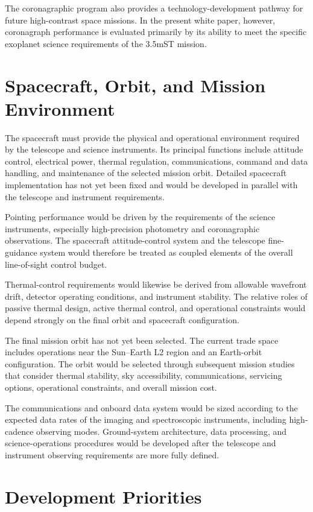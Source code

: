The coronagraphic program also provides a technology-development pathway
for future high-contrast space missions. In the present white paper,
however, coronagraph performance is evaluated primarily by its ability to
meet the specific exoplanet science requirements of the 3.5mST mission.


\section{Spacecraft, Orbit, and Mission Environment}

The spacecraft must provide the physical and operational environment
required by the telescope and science instruments. Its principal functions
include attitude control, electrical power, thermal regulation,
communications, command and data handling, and maintenance of the selected
mission orbit. Detailed spacecraft implementation has not yet been fixed
and would be developed in parallel with the telescope and instrument
requirements.

Pointing performance would be driven by the requirements of the science
instruments, especially high-precision photometry and coronagraphic
observations. The spacecraft attitude-control system and the telescope
fine-guidance system would therefore be treated as coupled elements of the
overall line-of-sight control budget.

Thermal-control requirements would likewise be derived from allowable
wavefront drift, detector operating conditions, and instrument stability.
The relative roles of passive thermal design, active thermal control, and
operational constraints would depend strongly on the final orbit and
spacecraft configuration.

The final mission orbit has not yet been selected. The current trade space
includes operations near the Sun--Earth L2 region and an Earth-orbit
configuration. The orbit would be selected through subsequent mission
studies that consider thermal stability, sky accessibility, communications,
servicing options, operational constraints, and overall mission cost.

The communications and onboard data system would be sized according to the
expected data rates of the imaging and spectroscopic instruments, including
high-cadence observing modes. Ground-system architecture, data processing,
and science-operations procedures would be developed after the telescope
and instrument observing requirements are more fully defined.

\section{Development Priorities}

